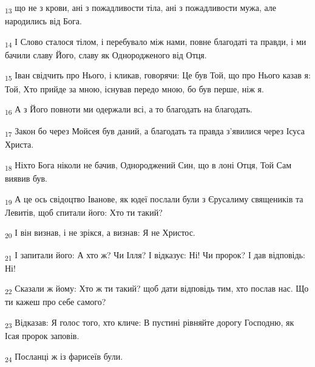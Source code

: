 \begin{tcolorbox}
\textsubscript{13} що не з крови, ані з пожадливости тіла, ані з пожадливости мужа, але народились від Бога.
\end{tcolorbox}
\begin{tcolorbox}
\textsubscript{14} І Слово сталося тілом, і перебувало між нами, повне благодаті та правди, і ми бачили славу Його, славу як Однородженого від Отця.
\end{tcolorbox}
\begin{tcolorbox}
\textsubscript{15} Іван свідчить про Нього, і кликав, говорячи: Це був Той, що про Нього казав я: Той, Хто прийде за мною, існував передо мною, бо був перше, ніж я.
\end{tcolorbox}
\begin{tcolorbox}
\textsubscript{16} А з Його повноти ми одержали всі, а то благодать на благодать.
\end{tcolorbox}
\begin{tcolorbox}
\textsubscript{17} Закон бо через Мойсея був даний, а благодать та правда з'явилися через Ісуса Христа.
\end{tcolorbox}
\begin{tcolorbox}
\textsubscript{18} Ніхто Бога ніколи не бачив, Однороджений Син, що в лоні Отця, Той Сам виявив був.
\end{tcolorbox}
\begin{tcolorbox}
\textsubscript{19} А це ось свідоцтво Іванове, як юдеї послали були з Єрусалиму священиків та Левитів, щоб спитали його: Хто ти такий?
\end{tcolorbox}
\begin{tcolorbox}
\textsubscript{20} І він визнав, і не зрікся, а визнав: Я не Христос.
\end{tcolorbox}
\begin{tcolorbox}
\textsubscript{21} І запитали його: А хто ж? Чи Ілля? І відказує: Ні! Чи пророк? І дав відповідь: Ні!
\end{tcolorbox}
\begin{tcolorbox}
\textsubscript{22} Сказали ж йому: Хто ж ти такий? щоб дати відповідь тим, хто послав нас. Що ти кажеш про себе самого?
\end{tcolorbox}
\begin{tcolorbox}
\textsubscript{23} Відказав: Я голос того, хто кличе: В пустині рівняйте дорогу Господню, як Ісая пророк заповів.
\end{tcolorbox}
\begin{tcolorbox}
\textsubscript{24} Посланці ж із фарисеїв були.
\end{tcolorbox}
